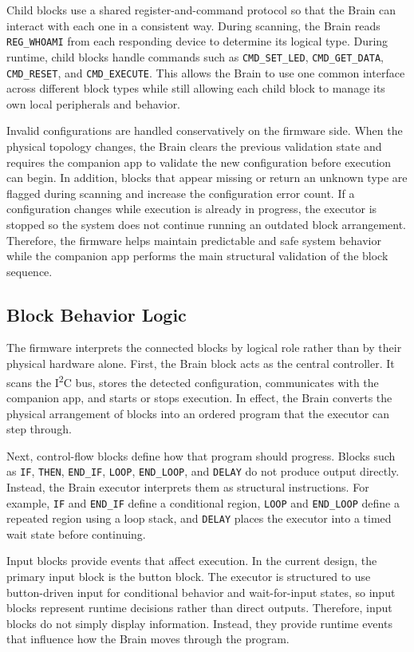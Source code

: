 \documentclass[10pt, conference]{IEEEtran}
\begin{document}
Child blocks use a shared register-and-command protocol so that the Brain can interact with each one in a consistent way. During scanning, the Brain reads \texttt{REG\_WHOAMI} from each responding device to determine its logical type. During runtime, child blocks handle commands such as \texttt{CMD\_SET\_LED}, \texttt{CMD\_GET\_DATA}, \texttt{CMD\_RESET}, and \texttt{CMD\_EXECUTE}. This allows the Brain to use one common interface across different block types while still allowing each child block to manage its own local peripherals and 
behavior. 

Invalid configurations are handled conservatively on the firmware side. When the physical topology changes, the Brain clears the previous validation state and requires the companion app to validate the new configuration before execution can begin. In addition, blocks that appear missing or return an unknown type are flagged during scanning and increase the configuration error count. If a configuration changes while execution is already in progress, the executor is stopped so the system does not continue running an outdated block arrangement. Therefore, the firmware helps maintain predictable and safe system behavior while the companion app performs the main structural validation of the block sequence. 

\subsection{Block Behavior Logic}
The firmware interprets the connected blocks by logical role rather than by their physical hardware alone. First, the Brain block acts as the central controller. It scans the I\textsuperscript{2}C bus, stores the detected configuration, communicates with the companion app, and starts or stops execution. In effect, the Brain converts the physical arrangement of blocks into an ordered program that the executor can step through. 

Next, control-flow blocks define how that program should progress. Blocks such as \texttt{IF}, \texttt{THEN}, \texttt{END\_IF}, \texttt{LOOP}, \texttt{END\_LOOP}, and \texttt{DELAY} do not produce output directly. Instead, the Brain executor interprets them as structural instructions. For example, \texttt{IF} and \texttt{END\_IF} define a conditional region, \texttt{LOOP} and \texttt{END\_LOOP} define a repeated region using a loop stack, and \texttt{DELAY} places the executor into a timed wait state before continuing. 

Input blocks provide events that affect execution. In the current design, the primary input block is the button block. The executor is structured to use button-driven input for conditional behavior and wait-for-input states, so input blocks represent runtime decisions rather than direct outputs. Therefore, input blocks do not simply display information. Instead, they provide runtime events that influence how the Brain moves through the program. 
\end{document}
